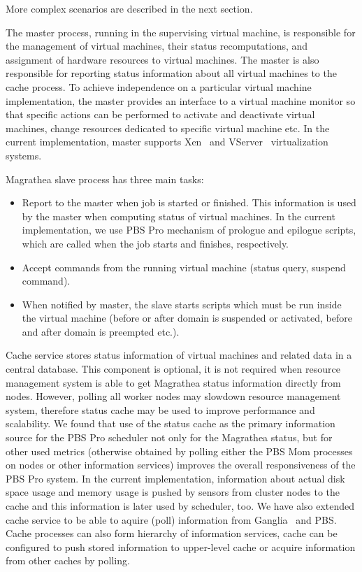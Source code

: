 \documentclass[a4paper]{article}
\begin{document}
More complex scenarios are described in the next section.

The master process, running in the supervising virtual machine, is responsible
for the management of virtual machines, their status recomputations, and
assignment of hardware resources to virtual machines. The master is also
responsible for reporting status information about all virtual machines to the
cache process. To achieve independence on a particular virtual machine
implementation, the master provides an interface to a virtual machine monitor
so that specific actions can be performed to activate and deactivate virtual
machines, change resources dedicated to specific virtual machine etc. In the
current implementation, master supports Xen~\cite{xen} and
VServer~\cite{vserver} virtualization systems.

Magrathea slave process has three main tasks:

\begin{itemize}

\item Report to the master when job is started or finished. This information
is used by the master when computing status of virtual machines. In the
current implementation, we use PBS Pro mechanism of prologue and epilogue
scripts, which are called when the job starts and finishes, respectively.

\item Accept commands from the running virtual machine (status query, suspend
command).

\item When notified by master, the slave starts scripts which must be run
inside the virtual machine (before or after domain is suspended or activated,
before and after domain is preempted etc.).

\end{itemize}

Cache service stores status information of virtual machines and related data
in a central database. This component is optional, it is not required when
resource management system is able to get Magrathea status information
directly from nodes. However, polling all worker nodes may slowdown resource
management system, therefore status cache may be used to improve performance
and scalability. We found that use of the status cache as the primary
information source for the PBS Pro scheduler not only for the Magrathea status,
but for other used metrics (otherwise obtained by polling either the PBS Mom
processes on nodes or other information services) improves the overall
responsiveness of the PBS Pro system. In the current implementation,
information about actual disk space usage and memory usage is pushed by
sensors from cluster nodes to the cache and this information is later used by
scheduler, too. We have also extended cache service to be able to aquire
(poll) information from Ganglia~\cite{ganglia} and PBS. Cache processes can
also form hierarchy of information services, cache can be configured to push
stored information to upper-level cache or acquire information from other
caches by polling.
\end{document}

